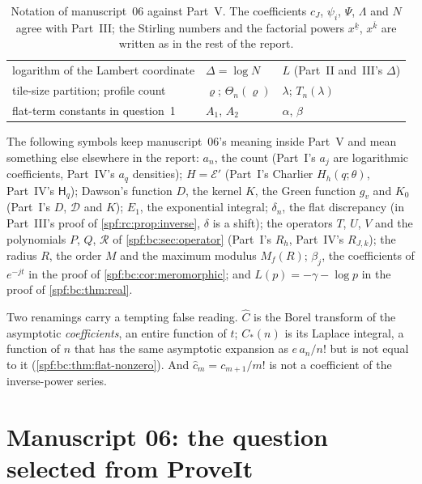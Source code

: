\documentclass[11pt]{article}
\numberwithin{equation}{section}
\theoremstyle{definition}
\theoremstyle{remark}
\theoremstyle{definition}
\newcommand{\fall}[2]{{#1}^{\underline{#2}}}
\newcommand{\rise}[2]{{#1}^{\overline{#2}}}
\newcommand{\bcC}{C_{\!*}}
\begin{document}
\begin{table}[htbp]
\begin{tabular}{@{}>{\raggedright\arraybackslash}p{}>{\raggedright\arraybackslash}p{}>{\raggedright\arraybackslash}p{}@{}}
logarithm of the Lambert coordinate & $\Delta=\log N$ & $L$ (Part~II and~III's $\Delta$)\\
tile-size partition; profile count & $\varrho$; $\Theta_n(\varrho)$ & $\lambda$; $T_n(\lambda)$\\
flat-term constants in question~1 & $A_1$, $A_2$ & $\alpha$, $\beta$\\
\bottomrule
\end{tabular}
\caption{Notation of manuscript~06 against Part~V. The coefficients $c_J$,
$\psi_i$, $\Psi$, $\Lambda$ and $N$ agree with Part~III; the Stirling numbers
and the factorial powers $\fall xk$, $\rise xk$ are written as in the rest of
the report.}
\label{spf:bc:tab:dictionary}
\end{table}

The following symbols keep manuscript~06's meaning inside Part~V and mean
something else elsewhere in the report: $a_n$, the count (Part~I's $a_j$ are
logarithmic coefficients, Part~IV's $a_q$ densities); $H=\mathcal E'$ (Part~I's
Charlier $H_h(q;\theta)$, Part~IV's $\mathsf H_q$); Dawson's function $D$, the
kernel $K$, the Green function $g_v$ and $K_0$ (Part~I's $D$, $\mathcal D$ and
$K$); $E_1$, the exponential integral; $\delta_n$, the flat discrepancy (in
Part~III's proof of \cref{spf:rc:prop:inverse}, $\delta$ is a shift); the
operators $T$, $U$, $V$ and the polynomials $P$, $Q$, $\mathcal R$ of
\cref{spf:bc:sec:operator} (Part~I's $R_h$, Part~IV's $R_{J,k}$); the
radius $R$, the order $M$ and the maximum modulus $M_f(R)$; $\beta_j$, the
coefficients of $e^{-jt}$ in the proof of \cref{spf:bc:cor:meromorphic}; and
$L(p)=-\gamma-\log p$ in the proof of \cref{spf:bc:thm:real}.

Two renamings carry a tempting false reading. $\widehat C$ is the Borel
transform of the asymptotic \emph{coefficients}, an entire function of $t$;
$\bcC(n)$ is its Laplace integral, a function of $n$ that has the same
asymptotic expansion as $e\,a_n/n!$ but is not equal to it
(\cref{spf:bc:thm:flat-nonzero}). And $\hat c_m=c_{m+1}/m!$ is not a
coefficient of the inverse-power series.

\section{Manuscript 06: the question selected from ProveIt}
\label{spf:bc:sec:context}
\end{document}
